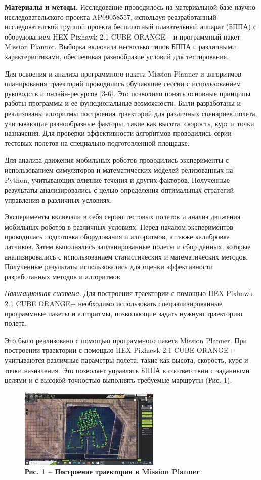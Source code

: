{\bfseries Материалы и методы.} Исследование проводилось на материальной
базе научно исследовательского проекта AP09058557, используя
реазработанный исследователской группой проекта беспилотный плавательный
аппарат (БППА) с оборудованием HEX Pixhawk 2.1 CUBE ORANGE+ и
программный пакет Mission Planner. Выборка включала несколько типов БППА
с различными характеристиками, обеспечивая разнообразие условий для
тестирования.

Для освоения и анализа программного пакета Mission Planner и алгоритмов
планирования траекторий проводились обучающие сессии с использованием
руководств и онлайн-ресурсов {[}3-6{]}. Это позволило понять основные
принципы работы программы и ее функциональные возможности. Были
разработаны и реализованы алгоритмы построения траекторий для различных
сценариев полета, учитывающие разнообразные факторы, такие как высота,
скорость, курс и точки назначения. Для проверки эффективности алгоритмов
проводились серии тестовых полетов на специально подготовленной
площадке.

Для анализа движения мобильных роботов проводились эксперименты с
использованием симуляторов и математических моделей релизованных на
Python, учитывающих влияние течения и других факторов. Полученные
результаты анализировались с целью определения оптимальных стратегий
управления в различных условиях.

Эксперименты включали в себя серию тестовых полетов и анализ движения
мобильных роботов в различных условиях. Перед началом экспериментов
проводилась подготовка оборудования и алгоритмов, а также калибровка
датчиков. Затем выполнялись запланированные полеты и сбор данных,
которые анализировались с использованием статистических и математических
методов. Полученные результаты использовались для оценки эффективности
разработанных методов и алгоритмов.

\emph{Навигационная система.} Для построения траектории с помощью HEX
Pixhawk 2.1 CUBE ORANGE+ необходимо использовать специализированные
программные пакеты и алгоритмы, позволяющие задать нужную траекторию
полета.

Это было реализовано с помощью программного пакета Mission Planner. При
построении траектории с помощью HEX Pixhawk 2.1 CUBE ORANGE+ учитываются
различные параметры полета, такие как высота, скорость, курс и точки
назначения. Это позволяет управлять БППА в соответствии с заданными
целями и с высокой точностью выполнять требуемые маршруты (Рис. 1).

\begin{figure}[H]
	\centering
	\includegraphics[width=0.6\textwidth]{assets/208}
	\caption*{\bfseries Рис. 1 -- Построение траектории в Mission Planner}
\end{figure}



